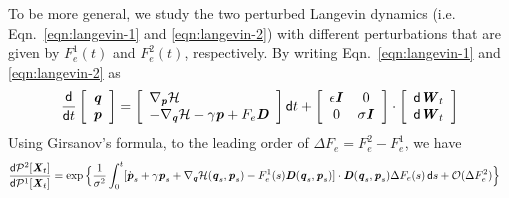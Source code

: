 \documentclass[aip,jcp,a4paper,reprint,onecolumn]{revtex4-1}
\newcommand{\vect}[1]{\textbf{\textit{#1}}}
\newcommand{\dd}{\textsf{d}}
\newcommand{\mh}{\mathcal H}
\begin{document}
To be more general, we study the two perturbed Langevin dynamics
(i.e. Eqn.~\eqref{eqn:langevin-1} and \eqref{eqn:langevin-2}) with
different perturbations that are given by $F_e^1(t)$ and $F_e^2(t)$,
respectively. 
By writing Eqn.~\eqref{eqn:langevin-1} and \eqref{eqn:langevin-2} as
\begin{align}
  \frac{\dd }{\dd t}
  \left[
    \begin{array}{l}
      \vect q\\
      \vect p
    \end{array}
  \right]
  =
  \left[
    \begin{array}{l}
      \nabla_{\vect p}\mh\\
      -\nabla_{\vect q}\mh - \gamma\vect p + F_e\vect D
    \end{array}
  \right]
  \dd t
  +
  \left[
    \begin{array}{cc}
      \epsilon \vect I & 0\\
      0 & \sigma\vect I
    \end{array}
  \right]
  \cdot
  \left[
    \begin{array}{l}
      \dd\vect W_t\\
      \dd\vect W_t
    \end{array}
  \right]
\end{align}
Using Girsanov's formula, to the leading order of $\Delta F_e = F_e^2 - F_e^1$,
we have
\begin{align}\label{eqn:girsanov-1}
  \frac{\dd\mathcal P^2[\vect X_t]}{\dd\mathcal P^1[\vect X_t]}
  &=
  \exp
  \Big\{
  \frac 1 {\sigma^2}
  \int_0^t
  [\dot{\vect p}_s +
  \gamma\vect p_s +
  \nabla_{\vect q}\mh(\vect q_s,\vect p_s)
  - F_e^1(s) \vect D(\vect q_s,\vect p_s)
  ]\cdot
  \vect D(\vect q_s,\vect p_s)
  \Delta F_e(s)\,
  \dd s
  + \mathcal O(\Delta F_e^2)
  \Big\} 
\end{align}
\end{document}
